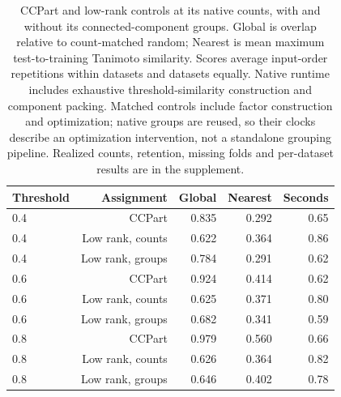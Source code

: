 \begin{table}[htbp]\centering\small
\begin{tabular}{lrrrr}
\toprule
Threshold & Assignment & Global & Nearest & Seconds\\\midrule
0.4 & CCPart & 0.835 & 0.292 & 0.65\\
0.4 & Low rank, counts & 0.622 & 0.364 & 0.86\\
0.4 & Low rank, groups & 0.784 & 0.291 & 0.62\\
0.6 & CCPart & 0.924 & 0.414 & 0.62\\
0.6 & Low rank, counts & 0.625 & 0.371 & 0.80\\
0.6 & Low rank, groups & 0.682 & 0.341 & 0.59\\
0.8 & CCPart & 0.979 & 0.560 & 0.66\\
0.8 & Low rank, counts & 0.626 & 0.364 & 0.82\\
0.8 & Low rank, groups & 0.646 & 0.402 & 0.78\\
\bottomrule\end{tabular}
\caption{CCPart and low-rank controls at its native counts, with and without its connected-component groups. Global is overlap relative to count-matched random; Nearest is mean maximum test-to-training Tanimoto similarity. Scores average input-order repetitions within datasets and datasets equally. Native runtime includes exhaustive threshold-similarity construction and component packing. Matched controls include factor construction and optimization; native groups are reused, so their clocks describe an optimization intervention, not a standalone grouping pipeline. Realized counts, retention, missing folds and per-dataset results are in the supplement.}
\label{tab:ccpart-controls}
\end{table}
